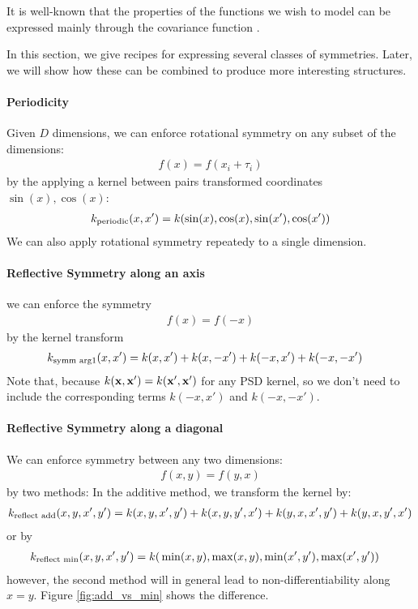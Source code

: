 
It is well-known that the properties of the functions we wish to model can be expressed mainly through the covariance function \cite{rasmussen38gaussian}.



In this section, we give recipes for expressing several classes of symmetries.  Later, we will show how these can be combined to produce more interesting structures.

\paragraph{Periodicity}
Given $D$ dimensions, we can enforce rotational symmetry on any subset of the dimensions:
%
\begin{align}
f(x) = f( x_i + \tau_i)%
\end{align}
%
by the applying a kernel between pairs transformed coordinates $\sin(x), \cos(x)$:
%
\begin{align}
k_{\textnormal{periodic}}(x, x') = k(\sin(x), \cos(x), \sin(x'), \cos(x'))
\end{align}
%
We can also apply rotational symmetry repeatedy to a single dimension.

\paragraph{Reflective Symmetry along an axis}
we can enforce the symmetry
\begin{align}
f(x) = f( -x)
\end{align}
%
by the kernel transform
%
\begin{align}
k_{\textnormal{symm arg1}}(x, x') & = k(x, x') + k(x, -x') + k(-x, x') + k(-x, -x')
\end{align}
%
Note that, because $k({\bf{x}}, {\bf{x}}') = k({\bf{x}}', {\bf{x}}')$ for any PSD kernel, so we don't need to include the corresponding terms $k(-x, x')$ and $k(-x, -x')$.

\paragraph{Reflective Symmetry along a diagonal}
We can enforce symmetry between any two dimensions:
%
\begin{align}
f(x, y) = f( y, x)
\end{align}
%
by two methods:  In the additive method, we transform the kernel by:
%
\begin{align}
k_{\textnormal{reflect add}}(x, y, x', y') 
 = k(x, y, x', y') + k(x, y, y', x')
 + k(y, x, x', y') + k(y, x, y', x')
\end{align}
%
or by
%
\begin{align}
k_{\textnormal{reflect min}}(x, y, x', y') = k( & \min(x, y), \max(x,y), %
\min(x', y'), \max(x',y') )
\end{align}
however, the second method will in general lead to non-differentiability along $x = y$.  Figure \ref{fig:add_vs_min} shows the difference.

